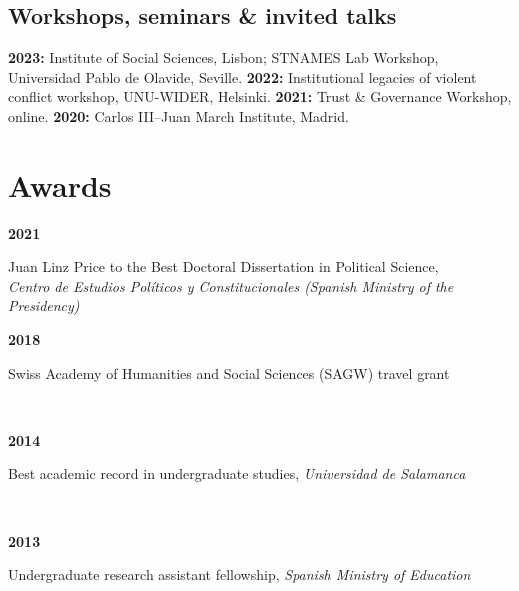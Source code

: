 \documentclass[a4paper, 12pt]{article}
\begin{document}

\vspace{-20pt}

\subsection*{Workshops, seminars \& invited talks}

\textbf{2023:} Institute of Social Sciences, Lisbon; STNAMES Lab Workshop, Universidad Pablo de Olavide, Seville. \textbf{2022:} Institutional legacies of violent conflict workshop, UNU-WIDER, Helsinki. \textbf{2021:} Trust \& Governance Workshop, online. \textbf{2020:} Carlos III--Juan March Institute, Madrid.

\section*{Awards}


\begin{minipage}[t]{0.1\textwidth}
\textbf{2021}
\end{minipage}\hfill\begin{minipage}[t]{0.9\textwidth}
Juan Linz Price to the Best Doctoral Dissertation in Political Science,\\\textit{Centro de Estudios Políticos y Constitucionales (Spanish Ministry of the Presidency)}\\\vspace{-8pt}
\end{minipage}
\begin{minipage}[t]{0.1\textwidth}
\textbf{2018}
\end{minipage}\hfill\begin{minipage}[t]{0.9\textwidth}
Swiss Academy of Humanities and Social Sciences (SAGW) travel grant
\end{minipage}\\
\begin{minipage}[t]{0.1\textwidth}
\textbf{2014}
\end{minipage}\hfill\begin{minipage}[t]{0.9\textwidth}
Best academic record in undergraduate studies, {\it Universidad de Salamanca}
\end{minipage}\\
\begin{minipage}[t]{0.1\textwidth}
\textbf{2013}
\end{minipage}\hfill\begin{minipage}[t]{0.9\textwidth}
Undergraduate research assistant fellowship, {\it Spanish Ministry of Education}
\end{minipage}\\
\end{document}
